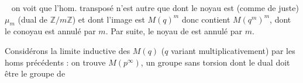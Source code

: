 \  on voit que l'hom. transposé n'est autre que
dont le noyau est (comme de juste) \deleted{\unsure{$\mu$}} $\mu_m$ (dual de $\mathbb Z/m\mathbb Z$) et dont l'image est $M(q)^m$ donc contient $M(q^m)^m$, dont le conoyau est annulé par $m$. Par suite, le  noyau de \unsure{$\varphi$} est annulé par $m$.

 Considérons la limite inductive des $M(q)$ ($q$ variant multiplicativement) par les homs précédents : on trouve $M(p^\infty)$, un groupe sans torsion dont le dual doit être le groupe de

